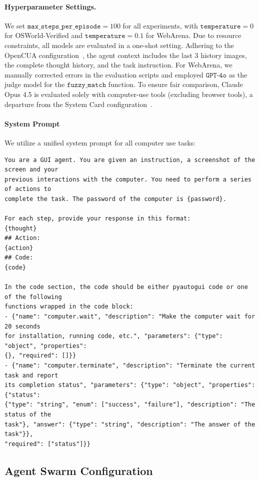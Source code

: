 \paragraph{Hyperparameter Settings.} We set $\texttt{max\_steps\_per\_episode}=100$ for all experiments, with $\texttt{temperature}=0$ for OSWorld-Verified and $\texttt{temperature}=0.1$ for WebArena. Due to resource constraints, all models are evaluated in a one-shot setting. Adhering to the OpenCUA configuration~\citep{wang2025opencuaopenfoundationscomputeruse}, the agent context includes the last 3 history images, the complete thought history, and the task instruction. For WebArena, we manually corrected errors in the evaluation scripts and employed $\texttt{GPT-4o}$ as the judge model for the $\texttt{fuzzy\_match}$ function. To ensure fair comparison, Claude Opus 4.5 is evaluated solely with computer-use tools (excluding browser tools), a departure from the System Card configuration~\citep{opus45report}.

\paragraph{System Prompt} We utilize a unified system prompt for all computer use tasks:
{\small
\begin{verbatim}
You are a GUI agent. You are given an instruction, a screenshot of the screen and your
previous interactions with the computer. You need to perform a series of actions to 
complete the task. The password of the computer is {password}.

For each step, provide your response in this format:
{thought}
## Action:
{action}
## Code:
{code}

In the code section, the code should be either pyautogui code or one of the following 
functions wrapped in the code block:
- {"name": "computer.wait", "description": "Make the computer wait for 20 seconds 
for installation, running code, etc.", "parameters": {"type": "object", "properties": 
{}, "required": []}}
- {"name": "computer.terminate", "description": "Terminate the current task and report
its completion status", "parameters": {"type": "object", "properties": {"status": 
{"type": "string", "enum": ["success", "failure"], "description": "The status of the 
task"}, "answer": {"type": "string", "description": "The answer of the task"}}, 
"required": ["status"]}}
\end{verbatim}
}



\subsection{Agent Swarm Configuration}
\label{app:eval_swarm}
